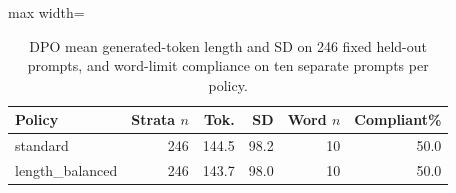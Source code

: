 \begin{table}[!htbp]
\centering
\caption{DPO mean generated-token length and SD on 246 fixed held-out prompts, and word-limit compliance on ten separate prompts per policy.}
\label{tab:dpo-word}
\scriptsize
\setlength{\tabcolsep}{3.4pt}
\begin{adjustbox}{max width=\linewidth}
\begin{tabular}{lrrrrr}
\toprule
Policy & Strata $n$ & Tok. & SD & Word $n$ & Compliant\% \\
\midrule
standard & 246 & 144.5 & 98.2 & 10 & 50.0 \\
length\_balanced & 246 & 143.7 & 98.0 & 10 & 50.0 \\
\bottomrule
\end{tabular}
\end{adjustbox}
\end{table}
